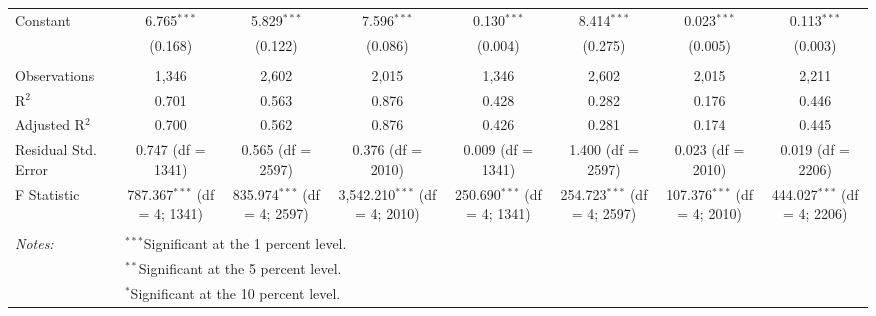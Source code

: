 \begin{table}[!htbp]
\begin{tabular}{@{\extracolsep{5pt}}lccccccc}
 Constant & 6.765$^{***}$ & 5.829$^{***}$ & 7.596$^{***}$ & 0.130$^{***}$ & 8.414$^{***}$ & 0.023$^{***}$ & 0.113$^{***}$ \\ 
  & (0.168) & (0.122) & (0.086) & (0.004) & (0.275) & (0.005) & (0.003) \\ 
  & & & & & & & \\ 
Observations & 1,346 & 2,602 & 2,015 & 1,346 & 2,602 & 2,015 & 2,211 \\ 
R$^{2}$ & 0.701 & 0.563 & 0.876 & 0.428 & 0.282 & 0.176 & 0.446 \\ 
Adjusted R$^{2}$ & 0.700 & 0.562 & 0.876 & 0.426 & 0.281 & 0.174 & 0.445 \\ 
Residual Std. Error & 0.747 (df = 1341) & 0.565 (df = 2597) & 0.376 (df = 2010) & 0.009 (df = 1341) & 1.400 (df = 2597) & 0.023 (df = 2010) & 0.019 (df = 2206) \\ 
F Statistic & 787.367$^{***}$ (df = 4; 1341) & 835.974$^{***}$ (df = 4; 2597) & 3,542.210$^{***}$ (df = 4; 2010) & 250.690$^{***}$ (df = 4; 1341) & 254.723$^{***}$ (df = 4; 2597) & 107.376$^{***}$ (df = 4; 2010) & 444.027$^{***}$ (df = 4; 2206) \\ 
\hline \\[-1.8ex] 
\textit{Notes:} & \multicolumn{7}{l}{$^{***}$Significant at the 1 percent level.} \\ 
 & \multicolumn{7}{l}{$^{**}$Significant at the 5 percent level.} \\ 
 & \multicolumn{7}{l}{$^{*}$Significant at the 10 percent level.} \\ 
\end{tabular} 
\end{table} 
